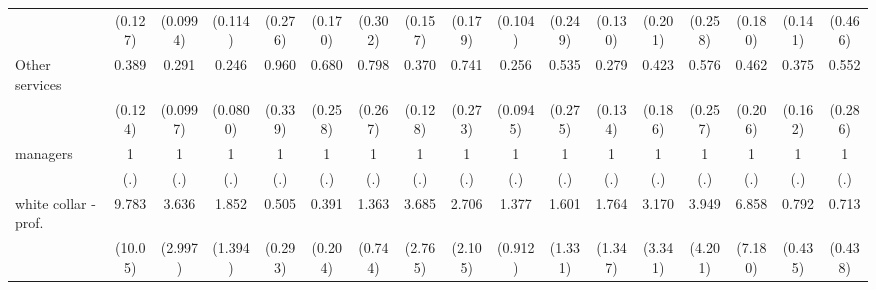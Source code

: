 {\begin{tabular}{l*{16}{c}}
                    &     (0.127)         &    (0.0994)         &     (0.114)         &     (0.276)         &     (0.170)         &     (0.302)         &     (0.157)         &     (0.179)         &     (0.104)         &     (0.249)         &     (0.130)         &     (0.201)         &     (0.258)         &     (0.180)         &     (0.141)         &     (0.466)         \\
[1em]
Other services      &       0.389\sym{**} &       0.291\sym{***}&       0.246\sym{***}&       0.960         &       0.680         &       0.798         &       0.370\sym{**} &       0.741         &       0.256\sym{***}&       0.535         &       0.279\sym{**} &       0.423         &       0.576         &       0.462         &       0.375\sym{*}  &       0.552         \\
                    &     (0.124)         &    (0.0997)         &    (0.0800)         &     (0.339)         &     (0.258)         &     (0.267)         &     (0.128)         &     (0.273)         &    (0.0945)         &     (0.275)         &     (0.134)         &     (0.186)         &     (0.257)         &     (0.206)         &     (0.162)         &     (0.286)         \\
[1em]
managers            &           1         &           1         &           1         &           1         &           1         &           1         &           1         &           1         &           1         &           1         &           1         &           1         &           1         &           1         &           1         &           1         \\
                    &         (.)         &         (.)         &         (.)         &         (.)         &         (.)         &         (.)         &         (.)         &         (.)         &         (.)         &         (.)         &         (.)         &         (.)         &         (.)         &         (.)         &         (.)         &         (.)         \\
[1em]
white collar - prof.&       9.783\sym{*}  &       3.636         &       1.852         &       0.505         &       0.391         &       1.363         &       3.685         &       2.706         &       1.377         &       1.601         &       1.764         &       3.170         &       3.949         &       6.858         &       0.792         &       0.713         \\
                    &     (10.05)         &     (2.997)         &     (1.394)         &     (0.293)         &     (0.204)         &     (0.744)         &     (2.765)         &     (2.105)         &     (0.912)         &     (1.331)         &     (1.347)         &     (3.341)         &     (4.201)         &     (7.180)         &     (0.435)         &     (0.438)         \\

\end{tabular}}
